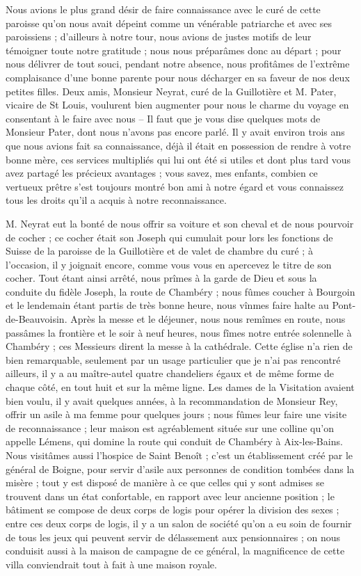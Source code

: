 \documentclass[11pt,a4paper]{report}
\begin{document}
Nous avions le plus grand désir de faire connaissance avec le curé de cette paroisse qu'on nous avait dépeint comme un vénérable patriarche et avec ses paroissiens ; d'ailleurs à notre tour, nous avions de justes motifs de leur témoigner toute notre gratitude ; nous nous préparâmes donc au départ ; pour nous délivrer de tout souci, pendant notre absence, nous profitâmes de l'extrême complaisance d'une bonne parente pour nous décharger en sa faveur de nos deux petites filles. Deux amis, Monsieur Neyrat, curé de la Guillotière et M. Pater, vicaire de St Louis, voulurent bien augmenter pour nous le charme du voyage en consentant à le faire avec nous -- Il faut que je vous dise quelques mots de Monsieur Pater, dont nous n'avons pas encore parlé. Il y avait environ trois ans que nous avions fait sa connaissance, déjà il était en possession de rendre à votre bonne mère, ces services multipliés qui lui ont été si utiles et dont plus tard vous avez partagé les précieux avantages ; vous savez, mes enfants, combien ce vertueux prêtre s'est toujours montré bon ami à notre égard et vous connaissez tous les droits qu'il a acquis à notre reconnaissance.

M. Neyrat eut la bonté de nous offrir sa voiture et son cheval et de nous pourvoir de cocher ; ce cocher était son Joseph qui cumulait pour lors les fonctions de Suisse de la paroisse de la Guillotière et de valet de chambre du curé ; à l'occasion, il y joignait encore, comme vous vous en apercevez le titre de son cocher. Tout étant ainsi arrêté, nous prîmes à la garde de Dieu et sous la conduite du fidèle Joseph, la route de Chambéry ; nous fûmes coucher à Bourgoin et le lendemain étant partis de très bonne heure, nous vînmes faire halte au Pont-de-Beauvoisin. Après la messe et le déjeuner, nous nous remîmes en route, nous passâmes la frontière et le soir à neuf heures, nous fîmes notre entrée solennelle à Chambéry ; ces Messieurs dirent la messe à la cathédrale. Cette église n'a rien de bien remarquable, seulement par un usage particulier que je n'ai pas rencontré ailleurs, il y a au maître-autel quatre chandeliers égaux et de même forme de chaque côté, en tout huit et sur la même ligne. Les dames de la Visitation avaient bien voulu, il y avait quelques années, à la recommandation de Monsieur Rey, offrir un asile à ma femme pour quelques jours ; nous fûmes leur faire une visite de reconnaissance ; leur maison est agréablement située sur une colline qu'on appelle Lémens, qui domine la route qui conduit de Chambéry à Aix-les-Bains. Nous visitâmes aussi l'hospice de Saint Benoît ; c'est un établissement créé par le général de Boigne, pour servir d'asile aux personnes de condition tombées dans la misère ; tout y est disposé de manière à ce que celles qui y sont admises se trouvent dans un état confortable, en rapport avec leur ancienne position ; le bâtiment se compose de deux corps de logis pour opérer la division des sexes ; entre ces deux corps de logis, il y a un salon de société qu'on a eu soin de fournir de tous les jeux qui peuvent servir de délassement aux pensionnaires ; on nous conduisit aussi à la maison de campagne de ce général, la magnificence de cette villa conviendrait tout à fait à une maison royale.
\end{document}
